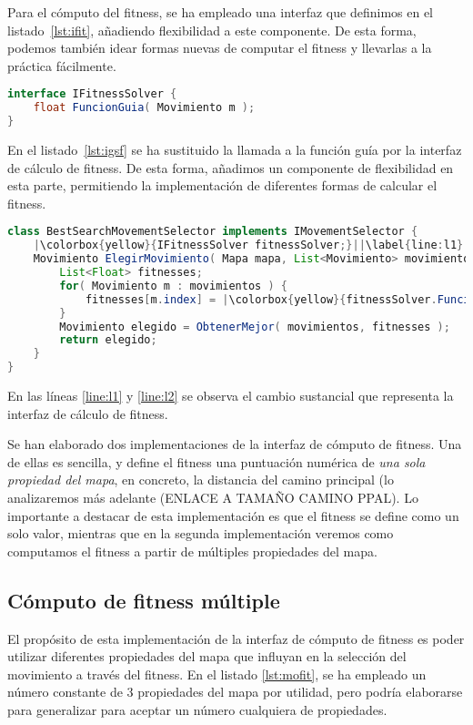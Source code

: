 Para el cómputo del fitness, se ha empleado una interfaz que definimos en el listado~\ref{lst:ifit}, añadiendo flexibilidad a este componente. De esta forma, podemos también idear formas nuevas de computar el fitness y llevarlas a la práctica fácilmente.

\begin{lstlisting}[caption={Interfaz de cómputo de fitness},label={lst:ifit},language=Java]
interface IFitnessSolver {
	float FuncionGuia( Movimiento m );
}
\end{lstlisting}

En el listado~\ref{lst:igsf} se ha sustituido la llamada a la función guía por la interfaz de cálculo de fitness. De esta forma, añadimos un componente de flexibilidad en esta parte, permitiendo la implementación de diferentes formas de calcular el fitness.

\begin{lstlisting}[caption={Interfaz de selección de movimiento basada en búsqueda},label={lst:igsf},language=Java,escapechar=|]
class BestSearchMovementSelector implements IMovementSelector {
	|\colorbox{yellow}{IFitnessSolver fitnessSolver;}||\label{line:l1}|
	Movimiento ElegirMovimiento( Mapa mapa, List<Movimiento> movimientos ) {
		List<Float> fitnesses;
		for( Movimiento m : movimientos ) {
			fitnesses[m.index] = |\colorbox{yellow}{fitnessSolver.FuncionGuia( mapa, m );}||\label{line:l2}|
		}
		Movimiento elegido = ObtenerMejor( movimientos, fitnesses );
		return elegido;
	}
}
\end{lstlisting}

En las líneas \ref{line:l1} y \ref{line:l2} se observa el cambio sustancial que representa la interfaz de cálculo de fitness.

Se han elaborado dos implementaciones de la interfaz de cómputo de fitness. Una de ellas es sencilla, y define el fitness una puntuación numérica de \emph{una sola propiedad del mapa}, en concreto, la distancia del camino principal (lo analizaremos más adelante (ENLACE A TAMAÑO CAMINO PPAL). Lo importante a destacar de esta implementación es que el fitness se define como un solo valor, mientras que en la segunda implementación veremos como computamos el fitness a partir de múltiples propiedades del mapa.

\subsection{Cómputo de fitness múltiple}

El propósito de esta implementación de la interfaz de cómputo de fitness es poder utilizar diferentes propiedades del mapa que influyan en la selección del movimiento a través del fitness. En el listado \ref{lst:mofit}, se ha empleado un número constante de 3 propiedades del mapa por utilidad, pero podría elaborarse para generalizar para aceptar un número cualquiera de propiedades.

